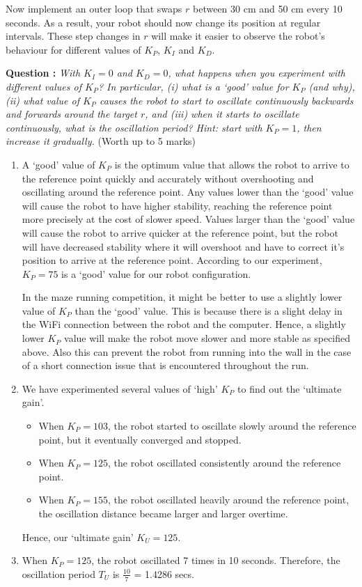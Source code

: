 \documentclass[hidelinks,a4paper,11pt]{article}
\newcounter{question}
\newcommand\myq{\refstepcounter{question}\thequestion}
\begin{document}
Now implement an outer loop that swaps $r$ between 30 cm and 50 cm every 10 seconds.  As a result,
your robot should now change its position at regular intervals.  These step changes in $r$ will make
it easier to observe the robot's behaviour for different values of $K_P$, $K_I$ and $K_D$.

{\bfseries Question \myq:}  \emph{With $K_I=0$ and $K_D=0$, what happens when you experiment with
different values of $K_P$?  In particular, (i) what is a `good' value for $K_P$ (and why), (ii) what
value of $K_P$ causes the robot to start to oscillate continuously backwards and forwards around the
target $r$, and (iii) when it starts to oscillate continuously, what is the oscillation period?
Hint: start with $K_P =1$, then increase it gradually.} (Worth up to 5 marks)\\
\begin{mdframed}
\begin{enumerate}[label=(\roman*)]
  \item A `good' value of $K_P$ is the optimum value that allows the robot to arrive to the
    reference point quickly and accurately without overshooting and oscillating around the reference
    point. Any values lower than the `good' value will cause the robot to have higher stability,
    reaching the reference point more precisely at the cost of slower speed. Values larger than the
    `good' value will cause the robot to arrive quicker at the reference point, but the robot will
    have decreased stability where it will overshoot and have to correct it's position to arrive at
    the reference point. According to our experiment, $K_P = 75$ is a `good' value for our robot
    configuration. \par In the maze running competition, it might be better to use a slightly lower
    value of $K_P$ than the `good' value. This is because there is a slight delay in the WiFi
    connection between the robot and the computer. Hence, a slightly lower $K_P$ value will make the
    robot move slower and more stable as specified above. Also this can prevent the robot from
    running into the wall in the case of a short connection issue that is encountered throughout the
    run.
  \item We have experimented several values of `high' $K_P$ to find out the `ultimate gain'.
\begin{itemize}
\item When $K_P = 103$, the robot started to oscillate slowly around the reference point, but it
eventually converged and stopped.
\item When $K_P = 125$, the robot oscillated consistently around the reference point.
\item When $K_P = 155$, the robot oscillated heavily around the reference point, the oscillation
distance became larger and larger overtime.
\end{itemize}
  Hence, our `ultimate gain' $K_U = 125$.
\item When $K_P = 125$, the robot oscillated 7 times in 10 seconds. Therefore, the oscillation
period $T_U$ is \( \frac{10}{7} \) = 1.4286 secs.
\end{enumerate}
\end{mdframed}
\end{document}
